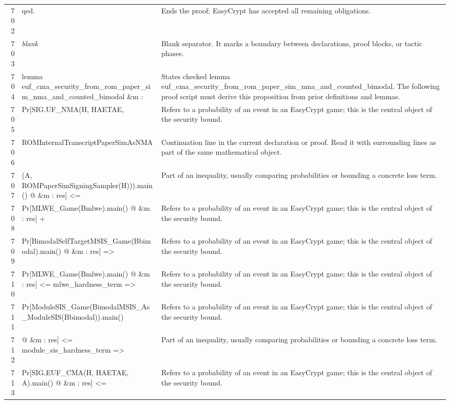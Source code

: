 \documentclass[10pt]{article}
\begin{document}
\begin{longtable}{r L{0.53\textwidth} L{0.37\textwidth}}
702 & {\ttfamily\scriptsize qed.} & Ends the proof; EasyCrypt has accepted all remaining obligations. \\
703 & {\ttfamily\scriptsize \emph{blank}} & Blank separator.  It marks a boundary between declarations, proof blocks, or tactic phases. \\
704 & {\ttfamily\scriptsize lemma euf\_cma\_security\_from\_rom\_paper\_sim\_nma\_and\_counted\_bimodal \&m :} & States checked lemma euf\_cma\_security\_from\_rom\_paper\_sim\_nma\_and\_counted\_bimodal.  The following proof script must derive this proposition from prior definitions and lemmas. \\
705 & {\ttfamily\scriptsize   Pr[SIG.UF\_NMA(H, HAETAE,} & Refers to a probability of an event in an EasyCrypt game; this is the central object of the security bound. \\
706 & {\ttfamily\scriptsize        ROMInternalTranscriptPaperSimAsNMA} & Continuation line in the current declaration or proof.  Read it with surrounding lines as part of the same mathematical object. \\
707 & {\ttfamily\scriptsize          (A, ROMPaperSimSigningSampler(H))).main() @ \&m : res] <=} & Part of an inequality, usually comparing probabilities or bounding a concrete loss term. \\
708 & {\ttfamily\scriptsize     Pr[MLWE\_Game(Bmlwe).main() @ \&m : res] +} & Refers to a probability of an event in an EasyCrypt game; this is the central object of the security bound. \\
709 & {\ttfamily\scriptsize     Pr[BimodalSelfTargetMSIS\_Game(Bbimodal).main() @ \&m : res] =>} & Refers to a probability of an event in an EasyCrypt game; this is the central object of the security bound. \\
710 & {\ttfamily\scriptsize   Pr[MLWE\_Game(Bmlwe).main() @ \&m : res] <= mlwe\_hardness\_term =>} & Refers to a probability of an event in an EasyCrypt game; this is the central object of the security bound. \\
711 & {\ttfamily\scriptsize   Pr[ModuleSIS\_Game(BimodalMSIS\_As\_ModuleSIS(Bbimodal)).main()} & Refers to a probability of an event in an EasyCrypt game; this is the central object of the security bound. \\
712 & {\ttfamily\scriptsize        @ \&m : res] <= module\_sis\_hardness\_term =>} & Part of an inequality, usually comparing probabilities or bounding a concrete loss term. \\
713 & {\ttfamily\scriptsize   Pr[SIG.EUF\_CMA(H, HAETAE, A).main() @ \&m : res] <=} & Refers to a probability of an event in an EasyCrypt game; this is the central object of the security bound. \\

\end{longtable}
\end{document}
